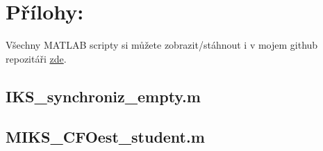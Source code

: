 \documentclass[10pt, a4paper]{article}%
\begin{document}
\section*{\Large Přílohy:}
Všechny MATLAB scripty si můžete zobrazit/stáhnout i v mojem github
repozitáři \href{https://github.com/FilipPaul/ctvrtak_letni_semestr/blob/main/MKC_IKS/ukol_2_OFDM_CFO/README.md}{\color{blue} zde}.
\subsection*{IKS\_synchroniz\_empty.m}

\clearpage
\subsection*{MIKS\_CFOest\_student.m}

\end{document}
